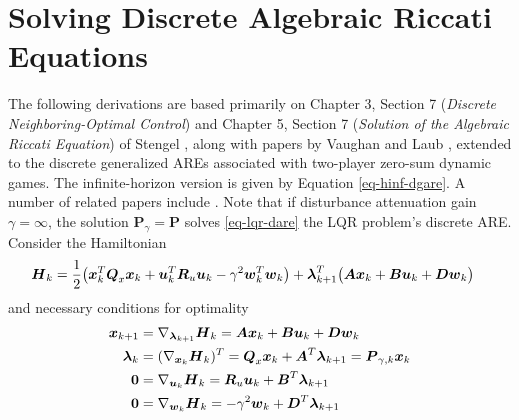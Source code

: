 \chapter{Solving Discrete Algebraic Riccati Equations}
\label{appendix:numericalMethods}
The following derivations are based primarily on Chapter 3, Section 7 (\emph{Discrete Neighboring-Optimal Control}) and Chapter 5, Section 7 (\emph{Solution of the Algebraic Riccati Equation}) of Stengel \cite{stengel}, along with papers by Vaughan \cite{vaughan1970nonrecursive} and Laub \cite{laub1979schur}, extended to the discrete generalized AREs associated with two-player zero-sum dynamic games.  The infinite-horizon version is given by Equation \eqref{eq-hinf-dgare}.  A number of related papers include \cite{pappas1980numerical, gardiner1986generalization, aliev1992discrete, gudmundsson1992scaling, chen1994non, takaba1996discrete, feng2009solving, rojas2011discrete}.  Note that if disturbance attenuation gain $\gamma = \infty$, the solution $\mathbf{P}_{\gamma} = \mathbf{P}$ solves \eqref{eq-lqr-dare} the LQR problem's discrete ARE.  Consider the Hamiltonian
\begin{equation}
\begin{aligned}
	\vb*{H}_{k} &= \frac{1}{2} \big{(} \vb*{x}_{k}^{T}\vb*{Q}_{x}\vb*{x}_{k}
			+ \vb*{u}_{k}^{T}\vb*{R}_{u}\vb*{u}_{k}
			- \gamma^{2} \vb*{w}_{k}^{T}\vb*{w}_{k} \big{)} + 
			\vb*{\lambda}_{k+1}^{T} \big{(} \vb*{A}\vb*{x}_{k}
			+ \vb*{B}\vb*{u}_{k} + \vb*{D}\vb*{w}_{k} \big{)}
\end{aligned} \label{hamiltonian}
\end{equation}
and necessary conditions for optimality
\vspace{-12pt}
\begin{subequations}
\begin{align}
	\vb*{x}_{k+1} &= \nabla_{\vb*{\lambda}_{k+1}} \vb*{H}_{k}
		= \vb*{A}\vb*{x}_{k} + \vb*{B}\vb*{u}_{k} + \vb*{D}\vb*{w}_{k}\\
	\vb*{\lambda}_{k} &= (\nabla_{\vb*{x}_{k}} \vb*{H}_{k})^{T}
		= \vb*{Q}_{x}\vb*{x}_{k} +  \vb*{A}^{T}\vb*{\lambda}_{k+1}
		= \vb*{P}_{\gamma,k} \vb*{x}_{k}\\
	\vb*{0} &= \nabla_{\vb*{u}_{k}} \vb*{H}_{k}
		= \vb*{R}_{u}\vb*{u}_{k} +  \vb*{B}^{T}\vb*{\lambda}_{k+1}\\
	\vb*{0} &= \nabla_{\vb*{w}_{k}} \vb*{H}_{k}
		= - \gamma^{2} \vb*{w}_{k} +  \vb*{D}^{T}\vb*{\lambda}_{k+1}
\end{align} \label{conditions_for_optimality}
\end{subequations}\vspace{-30pt}\\
